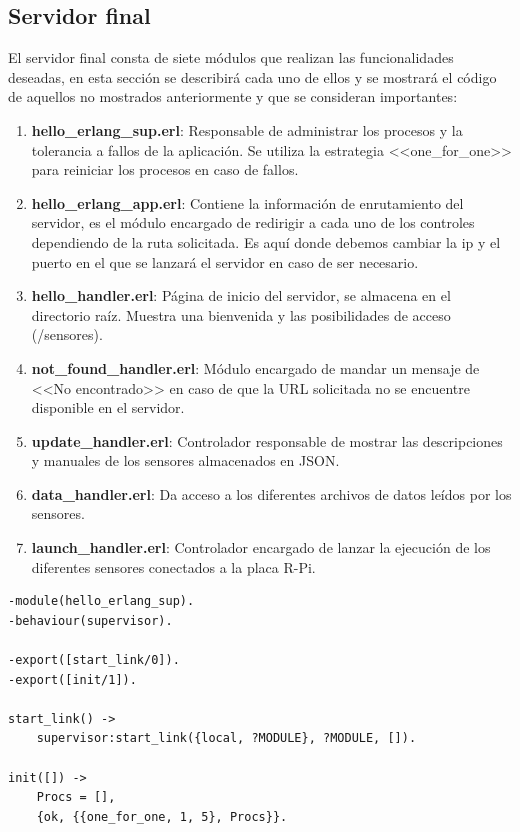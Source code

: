 \subsection{Servidor final}

El servidor final consta de siete módulos que realizan las funcionalidades deseadas, en esta sección se describirá cada uno de ellos y se mostrará el código de aquellos no mostrados anteriormente y que se consideran importantes:

\begin{enumerate}
    \item \textbf{hello\_erlang\_sup.erl}: Responsable de administrar los procesos y la tolerancia a fallos de la aplicación. Se utiliza la estrategia <<one\_for\_one>> para reiniciar los procesos en caso de fallos.
    \item \textbf{hello\_erlang\_app.erl}: Contiene la información de enrutamiento del servidor, es el módulo encargado de redirigir a cada uno de los controles dependiendo de la ruta solicitada. Es aquí donde debemos cambiar la ip y el puerto en el que se lanzará el servidor en caso de ser necesario.
    \item \textbf{hello\_handler.erl}:  Página de inicio del servidor, se almacena en el directorio raíz. Muestra una bienvenida y las posibilidades de acceso (/sensores).
    \item \textbf{not\_found\_handler.erl}: Módulo encargado de mandar un mensaje de <<No encontrado>> en caso de que la URL solicitada no se encuentre disponible en el servidor.
    \item \textbf{update\_handler.erl}: Controlador responsable de mostrar las descripciones y manuales de los sensores almacenados en JSON.
     \item \textbf{data\_handler.erl}: Da acceso a los diferentes archivos de datos leídos por los sensores.
      \item \textbf{launch\_handler.erl}: Controlador encargado de lanzar la ejecución de los diferentes sensores conectados a la placa R-Pi.
\end{enumerate}

\lstset{language=Erlang, breaklines=true, basicstyle=\sffamily\footnotesize}
\begin{lstlisting}[frame=single, caption=hello\_erlang\_sup.erl]
-module(hello_erlang_sup).
-behaviour(supervisor).

-export([start_link/0]).
-export([init/1]).

start_link() ->
	supervisor:start_link({local, ?MODULE}, ?MODULE, []).
 
init([]) ->
	Procs = [],
	{ok, {{one_for_one, 1, 5}, Procs}}.
\end{lstlisting}

